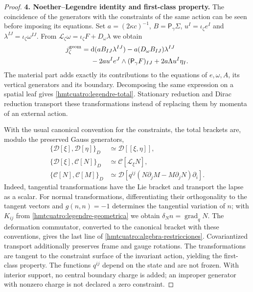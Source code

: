 \begin{proof}
\par\medskip\noindent\textbf{4. Noether--Legendre identity and first-class property.}\quad
The coincidence of the generators with the constraints of the same action can be seen before imposing its equations. Set \(a=(2\kappa c)^{-1}\), \(B=\mathsf P_\gamma\Sigma\), \(u^I=\iota_\zeta e^I\) and \(\lambda^{IJ}=\iota_\zeta\omega^{IJ}\). From \(\mathcal L_\zeta\omega=\iota_\zeta F+D_\omega\lambda\) we obtain
\begin{equation}
 \begin{split}
 j_\zeta^{\rm geom}
 ={}&\mathrm d(a B_{IJ}\lambda^{IJ})
   -a(D_\omega B_{IJ})\lambda^{IJ}\\
 &-2a u^Ie^J\wedge(\mathsf P_\gamma F)_{IJ}
       +2a\Lambda u^I\eta_I .
 \end{split}
 \label{hmtcuatro:noether-legendre}
\end{equation}
The material part adds exactly its contributions to the equations of \(e,\omega,A\), its vertical generators and its boundary. Decomposing the same expression on a spatial leaf gives \eqref{hmtcuatro:legendre-total}. Stationary reduction and Dirac reduction transport these transformations instead of replacing them by momenta of an external action.

With the usual canonical convention for the constraints, the total brackets are, modulo the preserved Gauss generators,
\begin{equation}
 \begin{aligned}
 \{\mathcal D[\xi],\mathcal D[\eta]\}_D
    &\simeq\mathcal D[[\xi,\eta]],\\
 \{\mathcal D[\xi],\mathcal C[N]\}_D
    &\simeq\mathcal C[\mathcal L_\xi N],\\
 \{\mathcal C[N],\mathcal C[M]\}_D
    &\simeq\mathcal D[
       q^{ij}(N\partial_jM-M\partial_jN)\partial_i].
 \end{aligned}
 \label{hmtcuatro:algebra-restricciones}
\end{equation}
Indeed, tangential transformations have the Lie bracket and transport the lapse as a scalar. For normal transformations, differentiating their orthogonality to the tangent vectors and \(g(n,n)=-1\) determines the tangential variation of \(n\); with \(K_{ij}\) from \eqref{hmtcuatro:legendre-geometrica} we obtain \(\delta_N n=\operatorname{grad}_qN\). The deformation commutator, converted to the canonical bracket with these conventions, gives the last line of \eqref{hmtcuatro:algebra-restricciones}. Covariantized transport additionally preserves frame and gauge rotations. The transformations are tangent to the constraint surface of the invariant action, yielding the first-class property. The functions \(q^{ij}\) depend on the state and are not frozen. With interior support, no central boundary charge is added; an improper generator with nonzero charge is not declared a zero constraint.


\end{proof}
